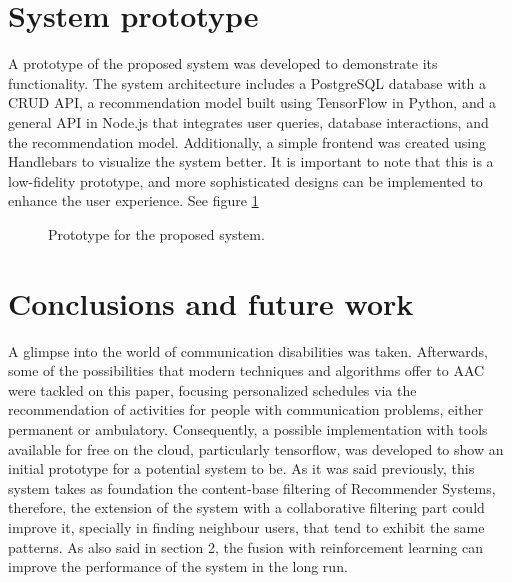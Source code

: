 \documentclass[10pt,twocolumn,letterpaper]{article}
\begin{document}
\section{System prototype}

A prototype of the proposed system was developed to demonstrate its functionality. The system architecture includes a PostgreSQL database with a CRUD API, a recommendation model built using TensorFlow in Python, and a general API in Node.js that integrates user queries, database interactions, and the recommendation model.  Additionally, a simple frontend was created using Handlebars to visualize the system better. It is important to note that this is a low-fidelity prototype, and more sophisticated designs can be implemented to enhance the user experience. See figure \ref{fig:prototype}

\begin{figure}
       \caption{Prototype for the proposed system.}
       \label{fig:prototype}
\end{figure}


\section{Conclusions and future work} 

A glimpse into the world of communication disabilities was taken. Afterwards, some of the possibilities that modern techniques and algorithms offer to AAC were tackled on this paper, focusing personalized schedules via the recommendation of activities for people with communication problems, either permanent or ambulatory. Consequently, a possible implementation with tools available for free on the cloud, particularly tensorflow, was developed to show an initial prototype for a potential system to be. As it was said previously, this system takes as foundation the content-base filtering of Recommender Systems, therefore, the extension of the system with a collaborative filtering part could improve it, specially in finding neighbour users, that tend to exhibit the same patterns. As also said in section 2, the fusion with reinforcement learning can improve the performance of the system in the long run.
\end{document}

